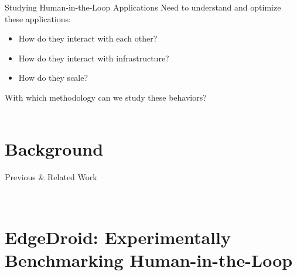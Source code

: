 \documentclass[aspectratio=1610]{beamer}
\begin{document}
\begin{frame}{Studying Human-in-the-Loop Applications}
    Need to understand and optimize these applications:%
    \begin{itemize}
        \item How do they interact with each other?
        \item How do they interact with infrastructure?
        \item How do they scale?
    \end{itemize}%
    \vspace{1em}%
    \begin{center}
        {\Large With which methodology can we study these behaviors?}\\
        \vspace{2em}%
        \\
        \Large\bfseries\color{red}
    \end{center}
\end{frame}

\section{Background}
\begin{frame}{Previous \& Related Work}
    \begin{center}
        \\
    \end{center}
\end{frame}

\section{EdgeDroid: Experimentally Benchmarking Human-in-the-Loop}
\end{document}
